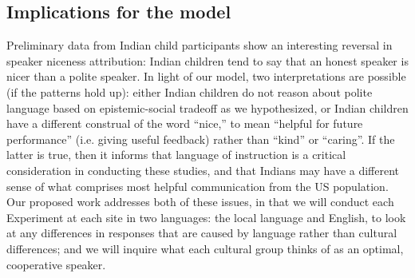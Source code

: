\subsection{Implications for the model}

Preliminary data from Indian child participants show an interesting reversal in speaker niceness attribution: Indian children tend to say that an honest speaker is nicer than a polite speaker. In light of our model, two interpretations are possible (if the patterns hold up): either Indian children do not reason about polite language based on epistemic-social tradeoff as we hypothesized, or Indian children have a different construal of the word ``nice,'' to mean ``helpful for future performance'' (i.e. giving useful feedback) rather than ``kind'' or ``caring''. If the latter is true, then it informs that language of instruction is a critical consideration in conducting these studies, and that Indians may have a different sense of what comprises most helpful communication from the US population. Our proposed work addresses both of these issues, in that we will conduct each Experiment at each site in two languages: the local language and English, to look at any differences in responses that are caused by language rather than cultural differences; and we will inquire what each cultural group thinks of as an optimal, cooperative speaker.



